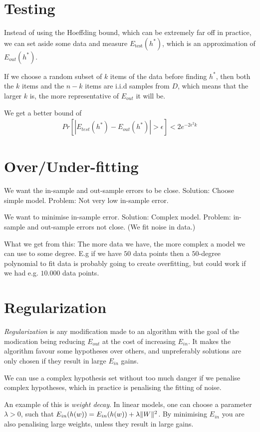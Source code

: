 \documentclass{article}
\begin{document}
\section{Testing}
  Instead of using the Hoeffding bound, which can be extremely far off in practice, we can set aside some data and measure $E_{\text{test}}(h^*)$, which is an approximation of $E_{out}(h^*)$. 

  If we choose a random subset of $k$ items of the data before finding $h^*$, then both the $k$ items and the $n - k$ items are i.i.d samples from $D$, which means that the larger $k$ is, the more representative of $E_{out}$ it will be. 

  We get a better bound of 
  \begin{align}
    Pr[
      |E_{test}(h^*) - E_{out}(h^*)| > \epsilon] < 2e^{-2\epsilon^2k}
  \end{align}  

\section{Over/Under-fitting}
  We want the in-sample and out-sample errors to be close. Solution: Choose simple model. Problem: Not very low in-sample error.

  We want to minimise in-sample error. Solution: Complex model. Problem: in-sample and out-sample errors not close. (We fit noise in data.)

  What we get from this: The more data we have, the more complex a model we can use to some degree.
  E.g if we have $50$ data points then a $50$-degree polynomial to fit data is probably going to create overfitting, but could work if we had e.g. $10.000$ data points.

\section{Regularization}
  \emph{Regularization} is any modification made to an algorithm with the goal of the modication being reducing $E_{out}$ at the cost of increasing $E_{in}$. It makes the algorithm favour some hypotheses over others, and unpreferably solutions are only chosen if they result in large $E_{in}$ gains. 

  We can use a complex hypothesis set without too much danger if we penalise complex hypotheses, which in practice is penalising the fitting of noise.

  An example of this is \emph{weight decay}. In linear models, one can choose a parameter $\lambda > 0$, such that $E_{in}(h(w)) = E_{in}(h(w)) + \lambda \lVert W \rVert^2$. By minimising $E_{in}$ you are also penalising large weights, unless they result in large gains. 
\end{document}
